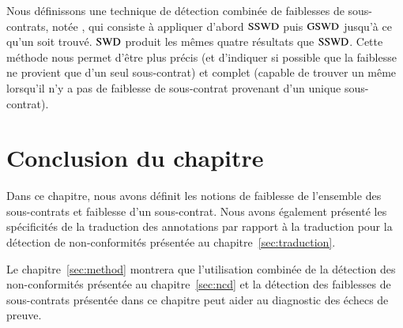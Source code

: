 Nous définissons une technique de détection combinée de faiblesses de
sous-contrats, notée \SWD, qui consiste à appliquer d'abord $\mathrm{SSWD}$ puis $\mathrm{GSWD}$
jusqu'à ce qu'un \SWCE soit trouvé. 
$\mathrm{SWD}$ produit les mêmes quatre résultats que $\mathrm{SSWD}$.
Cette méthode nous permet d'être plus précis (et d'indiquer si possible que la
faiblesse ne provient que d'un seul sous-contrat) et complet (capable de trouver
un \GSWCE même lorsqu'il n'y a pas de faiblesse de sous-contrat provenant d'un
unique sous-contrat).


\section*{Conclusion du chapitre}


Dans ce chapitre, nous avons définit les notions de faiblesse de l'ensemble des
sous-contrats et faiblesse d'un sous-contrat.
Nous avons également présenté les spécificités de la traduction des annotations
par rapport à la traduction pour la détection de non-conformités présentée au
chapitre~\ref{sec:traduction}.

Le chapitre~\ref{sec:method} montrera que l'utilisation combinée de la détection
des non-conformités présentée au chapitre~\ref{sec:ncd} et la détection des
faiblesses de sous-contrats présentée dans ce chapitre peut aider au diagnostic
des échecs de preuve.
